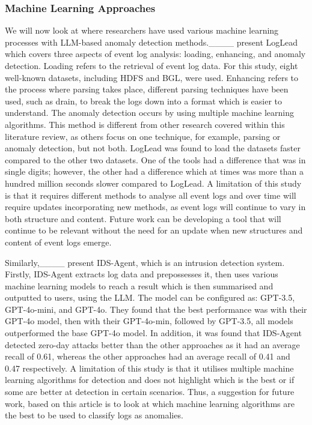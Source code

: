\subsubsection{Machine Learning Approaches}
We will now look at where researchers have used various machine learning processes with LLM-based anomaly detection methods.____ present LogLead which covers three aspects of event log analysis: loading, enhancing, and anomaly detection. Loading refers to the retrieval of event log data. For this study, eight well-known datasets, including HDFS and BGL, were used. Enhancing refers to the process where parsing takes place, different parsing techniques have been used, such as drain, to break the logs down into a format which is easier to understand. The anomaly detection occurs by using multiple machine learning algorithms. This method is different from other research covered within this literature review, as others focus on one technique, for example, parsing or anomaly detection, but not both. LogLead was found to load the datasets faster compared to the other two datasets. One of the tools had a difference that was in single digits; however, the other had a difference which at times was more than a hundred million seconds slower compared to LogLead. A limitation of this study is that it requires different methods to analyse all event logs and over time will require updates incorporating new methods, as event logs will continue to vary in both structure and content. Future work can be developing a tool that will continue to be relevant without the need for an update when new structures and content of event logs emerge. 

Similarly,____ present IDS-Agent, which is an intrusion detection system. Firstly, IDS-Agent extracts log data and prepossesses it, then uses various machine learning models to reach a result which is then summarised and outputted to users, using the LLM. The model can be configured as: GPT-3.5, GPT-4o-mini, and GPT-4o. They found that the best performance was with their GPT-4o model, then with their GPT-4o-min, followed by GPT-3.5, all models outperformed the base GPT-4o model. In addition, it was found that IDS-Agent detected zero-day attacks better than the other approaches as it had an average recall of 0.61, whereas the other approaches had an average recall of 0.41 and 0.47 respectively. A limitation of this study is that it utilises multiple machine learning algorithms for detection and does not highlight which is the best or if some are better at detection in certain scenarios. Thus, a suggestion for future work, based on this article is to look at which machine learning algorithms are the best to be used to classify logs as anomalies. 

